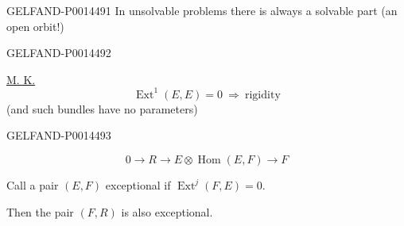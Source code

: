 \begin{GelfandAdjacentEvidence}{GELFAND-P001449}{1}
In unsolvable problems there is always a solvable part
(an open orbit!)

\end{GelfandAdjacentEvidence}
\begin{GelfandAdjacentEvidence}{GELFAND-P001449}{2}

\uline{M. K.}
\[
\operatorname{Ext}^{1}(E,E)=0\ \Rightarrow\ \text{rigidity}
\]
(and such bundles have no parameters)

\end{GelfandAdjacentEvidence}
\begin{GelfandAdjacentEvidence}{GELFAND-P001449}{3}

\[
0\longrightarrow R\longrightarrow E\otimes\operatorname{Hom}(E,F)
\longrightarrow F
\]

Call a pair \((E,F)\) exceptional if \(\operatorname{Ext}^{j}(F,E)=0\).

Then the pair \((F,R)\) is also exceptional.
\end{GelfandAdjacentEvidence}
